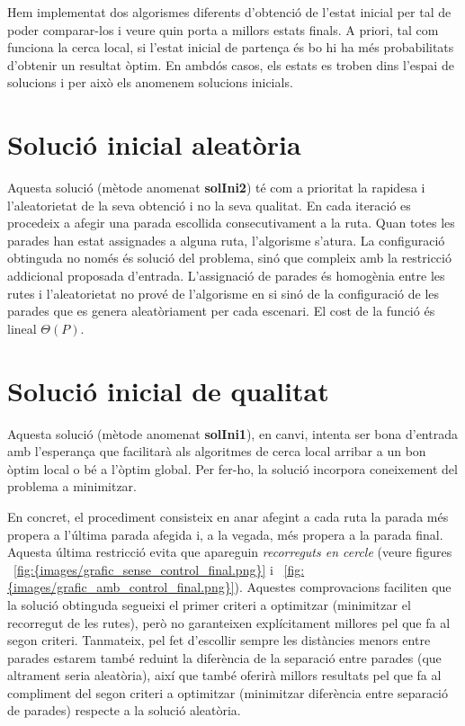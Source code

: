 
Hem implementat dos algorismes diferents d'obtenció de l'estat inicial per tal de poder comparar-los i veure quin porta a millors estats finals. A priori, tal com funciona la cerca local, si l'estat inicial de partença és bo hi ha més probabilitats d'obtenir un resultat òptim.  En ambdós casos, els estats es troben dins l'espai de solucions i per això els anomenem solucions inicials.

\section{Solució inicial aleatòria}

Aquesta solució (mètode anomenat \textbf{solIni2}) té com a prioritat la rapidesa i l'aleatorietat de la seva obtenció i no la seva qualitat. En cada iteració es procedeix a afegir una parada escollida consecutivament a la ruta. Quan totes les parades han estat assignades a alguna ruta, l'algorisme s'atura. La configuració obtinguda no només és solució del problema, sinó que compleix amb la restricció addicional proposada d'entrada. L'assignació de parades és homogènia entre les rutes i l'aleatorietat no prové de l'algorisme en si sinó de la configuració de les parades que es genera aleatòriament per cada escenari. El cost de la funció és lineal $\Theta(P)$.

\section{Solució inicial de qualitat}

Aquesta solució (mètode anomenat \textbf{solIni1}), en canvi, intenta ser bona d'entrada amb l'esperança que facilitarà als algoritmes de cerca local arribar a un bon òptim local o bé a l'òptim global. Per fer-ho, la solució incorpora coneixement del problema a minimitzar. 

En concret, el procediment consisteix en anar afegint a cada ruta la parada més propera a l'última parada afegida i, a la vegada, més propera a la parada final. Aquesta última restricció evita que apareguin \emph{recorreguts en cercle} (veure figures ~\ref{fig:{images/grafic_sense_control_final.png}} i ~\ref{fig:{images/grafic_amb_control_final.png}}). Aquestes comprovacions faciliten que la solució obtinguda segueixi el primer criteri a optimitzar (minimitzar el recorregut de les rutes), però no garanteixen explícitament millores pel que fa al segon criteri. Tanmateix, pel fet d'escollir sempre les distàncies menors entre parades estarem també reduint la diferència de la separació entre parades (que altrament seria aleatòria), així que també oferirà millors resultats pel que fa al compliment del segon criteri a optimitzar (minimitzar diferència entre separació de parades) respecte a la solució aleatòria.

